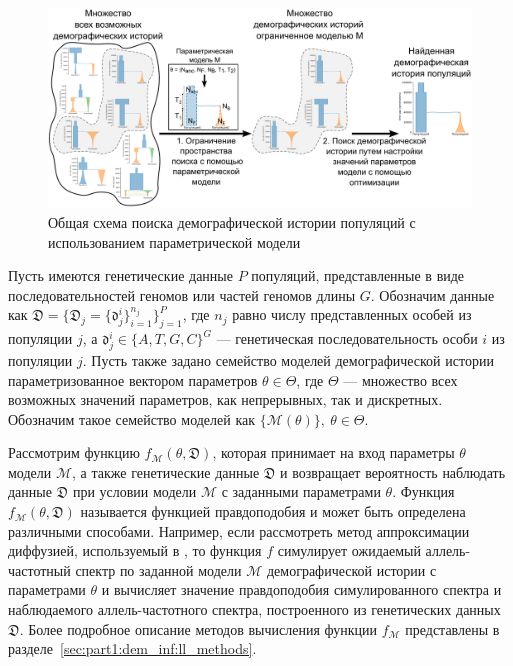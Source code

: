 \begin{figure}[ht]
    \centering
    \includegraphics[width=\textwidth]{images_2/scheme.pdf}
    \caption{Общая схема поиска демографической истории популяций с использованием параметрической модели}
    \label{fig:scheme}
\end{figure}

Пусть имеются генетические данные $P$ популяций, представленные в виде последовательностей геномов или частей геномов длины $G$.
Обозначим данные как $\mathfrak{D} = \{\mathfrak{D}_j = \{\mathfrak{d}_j^i\}_{i=1}^{n_j}\}_{j=1}^P$, где $n_j$ равно числу представленных особей из популяции $j$, а $\mathfrak{d}_j^i \in \{A, T, G, C\}^G$ --- генетическая последовательность особи $i$ из популяции $j$. 
Пусть также задано семейство моделей демографической истории параметризованное вектором параметров $\theta \in \Theta$, где $\Theta$ --- множество всех возможных значений параметров, как непрерывных, так и дискретных.
Обозначим такое семейство моделей как $\{\mathcal{M}(\theta)\},\ \theta \in \Theta$.

Рассмотрим функцию $f_\mathcal{M}(\theta, \mathfrak{D})$, которая принимает на вход параметры $\theta$ модели $\mathcal{M}$, а также генетические данные $\mathfrak{D}$ и возвращает вероятность наблюдать данные $\mathfrak{D}$ при условии модели $\mathcal{M}$ с заданными параметрами $\theta$.
Функция $f_\mathcal{M}(\theta, \mathfrak{D})$ называется функцией правдоподобия и может быть определена различными способами.
Например, если рассмотреть метод аппроксимации диффузией, используемый в \dadi, то функция $f$ симулирует ожидаемый аллель-частотный спектр по заданной модели $\mathcal{M}$ демографической истории с параметрами $\theta$ и вычисляет значение правдоподобия симулированного спектра и наблюдаемого аллель-частотного спектра, построенного из генетических данных $\mathfrak{D}$.
Более подробное описание методов вычисления функции $f_\mathcal{M}$ представлены в разделе~\ref{sec:part1:dem_inf:ll_methods}.

